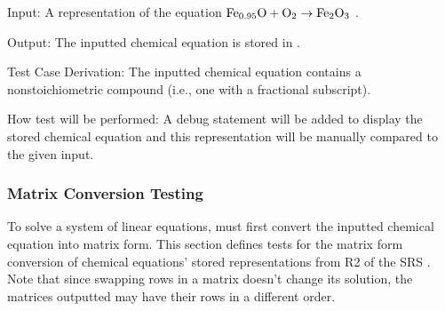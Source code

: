 \documentclass[12pt, titlepage]{article}
\begin{document}
\begin{enumerate}
    Input: A representation of the equation
    $\ce{Fe_{0.95}O} + \ce{O2} \rightarrow \ce{Fe2O3}$
    \cite{doubtnut_when_nodate}.

    Output: The inputted chemical equation is stored in \progname{}.

    Test Case Derivation: The inputted chemical equation contains a
    nonstoichiometric compound (i.e., one with a fractional subscript).

    How test will be performed: A debug statement will be added to display the
    stored chemical equation and this representation will be manually compared to
    the given input.

\end{enumerate}

\subsubsection{Matrix Conversion Testing}

To solve a system of linear equations, \progname{} must first convert the
inputted chemical equation into matrix form. This section defines tests for
the matrix form conversion of chemical equations' stored representations from
R2 of the SRS . 
Note that since swapping rows in a matrix doesn't change its solution, the
matrices outputted may have their rows in a different order.
\end{document}
